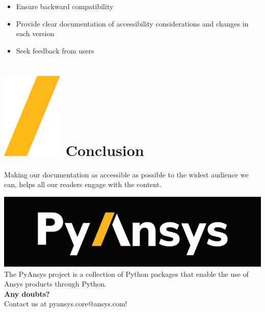 \documentclass[a0paper,fleqn]{src/betterposter}
\begin{document}
{\begin{itemize}
\item Ensure backward compatibility
\item Provide clear documentation of accessibility considerations and changes in each version
\item Seek feedback from users
\end{itemize}

\section{\includegraphics[height=\fontcharht\font`\S]{img/general/slash.png} Conclusion}

Making our documentation as accessible as possible to the widest audience we can, helps all our readers engage with the content.

\vfill

\includegraphics[width=\textwidth]{img/general/pyansys_dark}\\
The PyAnsys project is a collection of Python packages that enable the use of Ansys products through Python.
\\
\newline
\textbf{Any doubts?} \\Contact us at pyansys.core@ansys.com!
\\
\newline

}
\end{document}
